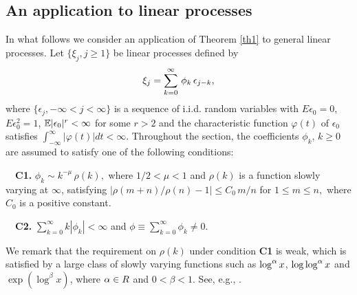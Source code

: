 \subsection{An application to linear processes}
In what follows we consider an  application of Theorem \ref {th1} to general linear processes.
Let $\{\xi _{j},j\geq 1\}$ be linear processes defined by
\begin{equation}
\xi _{j}=\sum_{k=0}^{\infty }\,\phi _{k}\,\epsilon _{j-k}, \la {sec2.f1}
\end{equation}
where $\{\epsilon _{j},-\infty <j<\infty \}$ is a sequence of i.i.d.
random variables with $E\epsilon _{0}=0$, $E\epsilon _{0}^{2}=1$, $\mathbb E|\epsilon_0|^r < \infty$ for some $r > 2$ and the
characteristic function $\varphi (t)$ of $\epsilon _{0}$ satisfies
$\int_{-\infty
}^{\infty }|\varphi (t)|dt<\infty $. Throughout the section, the coefficients $\phi_k$, $k \ge 0$ are assumed to satisfy one of the following conditions:

\noindent
\ \ \textbf{C1.} $\phi _{k}\sim k^{-\mu }\,\rho(k),$ where $1/2<\mu <1$ and $
\rho(k)$ is a function slowly varying at $\infty $, satisfying
$
|\rho(m+n)/\rho(n)-1| \le C_0\, m/n$ for $1\le m\le n,$
where $C_0$ is a positive constant.

\noindent
\ \ \textbf{C2.} $\sum_{k=0}^{\infty }k |\phi _{k}|<\infty $ and $\phi \equiv
\sum_{k=0}^{\infty }\phi_{k}\not =0$.

\noindent We remark that the requirement on $\rho(k)$ under condition {\bf C1} is weak,
which is satisfied by a large class of slowly varying functions such as $\log^{\alpha}x$,
$\log\log^{\alpha}x$ and $\exp(\log ^{\beta}x)$, where $\alpha\in R$ and $0<\beta<1$. See, e.g., \cite{wanglingulati2003}.

